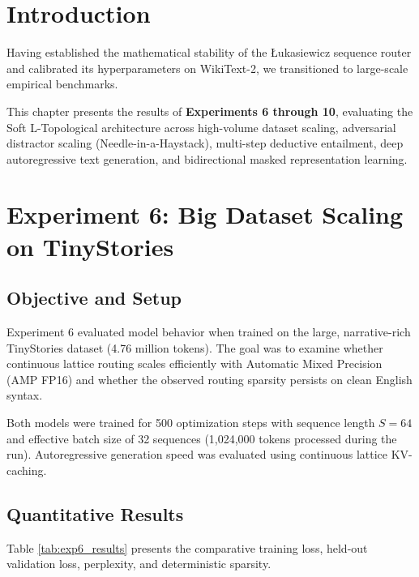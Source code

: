 \label{chap:large_scale_benchmarks}

\section{Introduction}
Having established the mathematical stability of the \L{}ukasiewicz sequence router and calibrated its hyperparameters on WikiText-2, we transitioned to large-scale empirical benchmarks. 

This chapter presents the results of \textbf{Experiments 6 through 10}, evaluating the Soft L-Topological architecture across high-volume dataset scaling, adversarial distractor scaling (Needle-in-a-Haystack), multi-step deductive entailment, deep autoregressive text generation, and bidirectional masked representation learning.

\section{Experiment 6: Big Dataset Scaling on TinyStories}
\label{sec:exp6}

\subsection{Objective and Setup}
Experiment 6 evaluated model behavior when trained on the large, narrative-rich TinyStories dataset (4.76 million tokens). The goal was to examine whether continuous lattice routing scales efficiently with Automatic Mixed Precision (AMP FP16) and whether the observed routing sparsity persists on clean English syntax.

Both models were trained for 500 optimization steps with sequence length $S = 64$ and effective batch size of 32 sequences (1,024,000 tokens processed during the run). Autoregressive generation speed was evaluated using continuous lattice KV-caching.

\subsection{Quantitative Results}
Table \ref{tab:exp6_results} presents the comparative training loss, held-out validation loss, perplexity, and deterministic sparsity.

